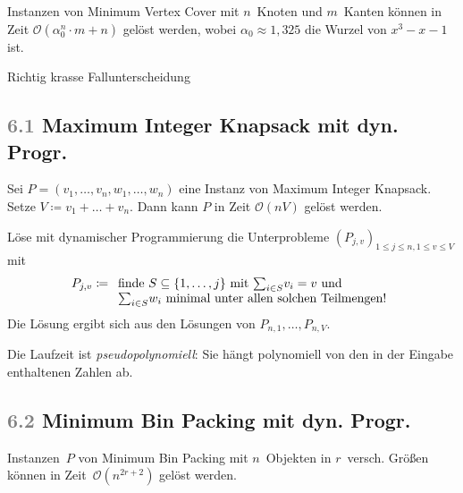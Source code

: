\documentclass{cheat-sheet}
\renewcommand{\O}{\mathcal{O}} %
\newcommand{\Problem}[1]{\textcolor{ProblemColor}{\textbf{#1}}}
\newcommand{\scriptSection}[1]{\textcolor{gray}{#1}\enspace}
\begin{document}
\begin{satz}
  Instanzen von Minimum Vertex Cover mit $n$~Knoten und $m$~Kanten können in Zeit $\O(\alpha_0^n \cdot m + n)$ gelöst werden, wobei $\alpha_0 \approx 1,325$ die Wurzel von $x^3 - x - 1$ ist.
\end{satz}

\begin{beweisidee}
  Richtig krasse Fallunterscheidung
\end{beweisidee}


\subsection{\scriptSection{6.1} \Problem{Maximum Integer Knapsack} mit dyn. Progr.}

\begin{satz}
  Sei $P = (v_1, \ldots, v_n, w_1, \ldots, w_n)$ eine Instanz von Maximum Integer Knapsack.
  Setze $V \coloneqq v_1 + \ldots + v_n$.
  Dann kann $P$ in Zeit $\O(n V)$ gelöst werden.
\end{satz}

\begin{alg}
  Löse mit dynamischer Programmierung die Unterprobleme $(P_{j,v})_{1 \leq j \leq n, 1 \leq v \leq V}$ mit
  \[
    P_{j,v} \coloneqq
      \begin{array}[t]{l}
        \text{finde $S \subseteq \{ 1, \ldots, j \}$ mit ${\sum}_{i \in S} v_i = v$ und} \\
        \text{${\sum}_{i \in S} w_i$ minimal unter allen solchen Teilmengen!}
      \end{array}
  \]
  Die Lösung ergibt sich aus den Lösungen von $P_{n,1}, \ldots, P_{n,V}$.
\end{alg}

\begin{bem}
  Die Laufzeit ist \emph{pseudopolynomiell}: Sie hängt polynomiell von den in der Eingabe enthaltenen Zahlen ab.
\end{bem}

\subsection{\scriptSection{6.2} \Problem{Minimum Bin Packing} mit dyn. Progr.}

\begin{satz}
  Instanzen~$P$ von Minimum Bin Packing mit $n$~Objekten in $r$~versch. Größen können in Zeit~$\O(n^{2r+2})$ gelöst werden.
\end{satz}
\end{document}
